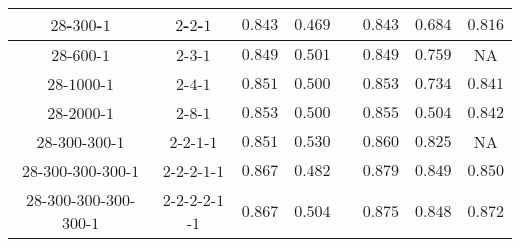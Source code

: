 \documentclass[12pt]{article}
\begin{document}
\begin{table}[t]
\begin{center}
{\begin{tabular}{cccccccc}
\hline                                                                                           
$28$-$300$-$1$ & $2$-$2$-$1$                          & $0.843$ & $0.469$          && $0.843$     & $0.684$ & $0.816$\\ %
\hline                                                                                           
$28$-$600$-$1$ & $2$-$3$-$1$                          & $0.849$ & $0.501$          && $0.849$     & $0.759$ & NA\\
\hline                                                                                           
$28$-$1000$-$1$ & $2$-$4$-$1$                         & $0.851$ & $0.500$       && $0.853$     & $0.734$ & $0.841$\\ %
\hline                                                                                           
$28$-$2000$-$1$ & $2$-$8$-$1$                         & $0.853$ & $0.500$      && $0.855$ & $0.504$ & $0.842$\\
\hline                                                                                           
$28$-$300$-$300$-$1$ & $2$-$2$-$1$-$1$                & $0.851$ & $0.530$          && $0.860$     & $0.825$ & NA\\ %
\hline                                                                                           
$28$-$300$-$300$-$300$-$1$ & $2$-$2$-$2$-$1$-$1$      & $0.867$ & $0.482$          && $0.879$ & $0.849$ & $0.850$\\
\hline
$28$-$300$-$300$-$300$-$300$-$1$ & $2$-$2$-$2$-$2$-$1$-$1$      & $0.867$ & $0.504$          && $0.875$ & $0.848$ & $0.872$\\
\hline


\end{tabular}
}
\end{center}
\label{table:higgs-result}
\end{table}
\end{document}
